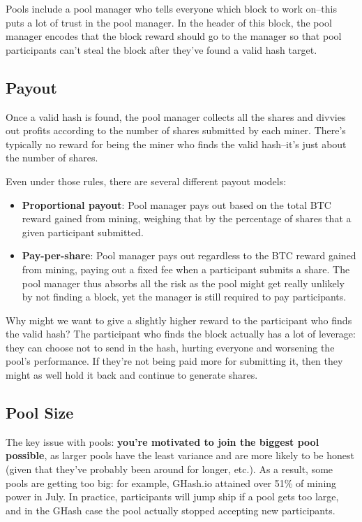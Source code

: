 \documentclass[12pt]{article}
\begin{document}
Pools include a pool manager who tells everyone which block to work on--this puts a lot of trust in the pool manager. In the header of this block, the pool manager encodes that the block reward should go to the manager so that pool participants can't steal the block after they've found a valid hash target.

\subsection*{Payout}

Once a valid hash is found, the pool manager collects all the shares and divvies out profits according to the number of shares submitted by each miner. There's typically no reward for being the miner who finds the valid hash--it's just about the number of shares.

Even under those rules, there are several different payout models:
\begin{itemize}
\item \textbf{Proportional payout}: Pool manager pays out based on the total BTC reward gained from mining, weighing that by the percentage of shares that a given participant submitted.
\item \textbf{Pay-per-share}: Pool manager pays out regardless to the BTC reward gained from mining, paying out a fixed fee when a participant submits a share. The pool manager thus absorbs all the risk as the pool might get really unlikely by not finding a block, yet the manager is still required to pay participants.
\end{itemize}

Why might we want to give a slightly higher reward to the participant who finds the valid hash? The participant who finds the block actually has a lot of leverage: they can choose not to send in the hash, hurting everyone and worsening the pool's performance. If they're not being paid more for submitting it, then they might as well hold it back and continue to generate shares.

\subsection*{Pool Size}

The key issue with pools: \textbf{you're motivated to join the biggest pool possible}, as larger pools have the least variance and are more likely to be honest (given that they've probably been around for longer, etc.). As a result, some pools are getting too big: for example, GHash.io attained over 51\% of mining power in July. In practice, participants will jump ship if a pool gets too large, and in the GHash case the pool actually stopped accepting new participants.
\end{document}
